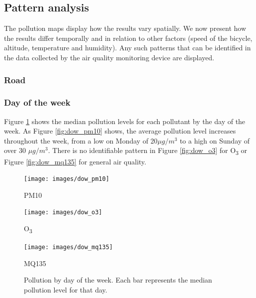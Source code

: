 \documentclass[11pt]{report}
\begin{document}
\subsection{Pattern analysis}

The pollution maps display how the results vary spatially. We now present how the results differ temporally and in relation to other factors (speed of the bicycle, altitude, temperature and humidity). Any such patterns that can be identified in the data collected by the air quality monitoring device are displayed.

\subsubsection{Road}




\subsubsection{Day of the week}

Figure \ref{fig:dow_bars} shows the median pollution levels for each pollutant by the day of the week. As Figure \ref{fig:dow_pm10} shows, the average pollution level increases throughout the week, from a low on Monday of 20$\mu g/m^3$ to a high on Sunday of over 30 $\mu g/m^3$. There is no identifiable pattern in Figure \ref{fig:dow_o3} for O\textsubscript{3} or Figure \ref{fig:dow_mq135} for general air quality.

\begin{figure}[!tbp]
    \centering
      \texttt{[image: images/dow\_pm10]}
      \caption{PM10}
      \label{fig:dow_pm10}
    \endminipage\hfill
      \texttt{[image: images/dow\_o3]}
      \caption{O\textsubscript{3}}
      \label{fig:dow_o3}
    \endminipage\hfill
      \texttt{[image: images/dow\_mq135]}
      \caption{MQ135}
      \label{fig:dow_mq135}
    \endminipage
    \caption[Pollution by day of the week.]{Pollution by day of the week. Each bar represents the median pollution level for that day.}
    \label{fig:dow_bars}
\end{figure}
\end{document}
